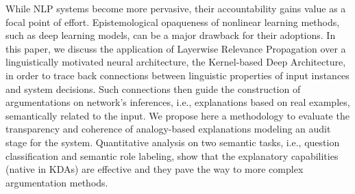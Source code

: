 While NLP systems become more pervasive, their accountability gains value as a focal point of effort. Epistemological opaqueness of nonlinear learning methods, such as deep learning models, can be a major drawback for their adoptions.
In this paper, we discuss the application of Layerwise Relevance Propagation over a linguistically motivated neural architecture, the Kernel-based Deep Architecture, in order to trace back connections between linguistic properties of input instances and system decisions. Such connections then guide the construction of argumentations on network's inferences, i.e., explanations based on real examples, semantically related to the input. 
We propose here a methodology to evaluate the transparency and coherence of analogy-based explanations modeling an audit stage for the system. Quantitative analysis on two semantic tasks, i.e., question classification and semantic role labeling, show that the explanatory capabilities (native in KDAs) are effective and they pave the way to more complex argumentation methods.